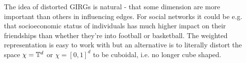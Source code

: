 The idea of distorted GIRGs is natural - that some dimension are more important than others in influencing edges. For social networks it could be e.g. that socioeconomic status of individuals has much higher impact on their friendships than whether they're into football or basketball. The weighted representation is easy to work with but an alternative is to literally distort the space $\chi = \mathbb{T}^d$ or $\chi = [0,1]^d$ to be cuboidal, i.e. no longer cube shaped.









